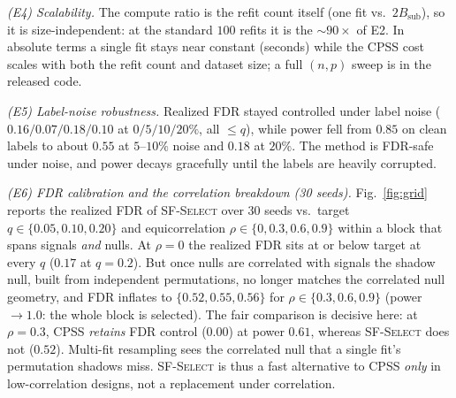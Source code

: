 \documentclass[conference]{IEEEtran}
\begin{document}
\emph{(E4) Scalability.} The compute ratio is the refit count itself (one fit
vs.\ $2B_{\mathrm{sub}}$), so it is size-independent: at the standard $100$
refits it is the $\sim 90\times$ of E2. In absolute terms a single fit stays near
constant (seconds) while the CPSS cost scales with both the refit count and
dataset size; a full $(n,p)$ sweep is in the released code.

\emph{(E5) Label-noise robustness.} Realized FDR stayed controlled under label
noise ($0.16/0.07/0.18/0.10$ at $0/5/10/20\%$, all $\le q$), while power fell
from $0.85$ on clean labels to about $0.55$ at $5$--$10\%$ noise and $0.18$ at
$20\%$. The method is FDR-safe under noise, and power decays gracefully until the
labels are heavily corrupted.

\emph{(E6) FDR calibration and the correlation breakdown (30 seeds).}
Fig.~\ref{fig:grid} reports the realized FDR of \textsc{SF-Select} over $30$
seeds vs.\ target $q\in\{0.05,0.10,0.20\}$ and equicorrelation
$\rho\in\{0,0.3,0.6,0.9\}$ within a block that spans signals \emph{and} nulls.
At $\rho{=}0$ the realized FDR sits at or below target at every $q$ ($0.17$ at
$q{=}0.2$). But once nulls are correlated with signals the shadow null, built
from independent permutations, no longer matches the correlated null geometry,
and FDR inflates to $\{0.52,0.55,0.56\}$ for $\rho\in\{0.3,0.6,0.9\}$ (power
$\to1.0$: the whole block is selected). The fair comparison is decisive here: at
$\rho{=}0.3$, CPSS \emph{retains} FDR control ($0.00$) at power $0.61$, whereas
\textsc{SF-Select} does not ($0.52$). Multi-fit resampling sees the correlated
null that a single fit's permutation shadows miss. \textsc{SF-Select} is thus a
fast alternative to CPSS \emph{only} in low-correlation designs, not a
replacement under correlation.
\end{document}
